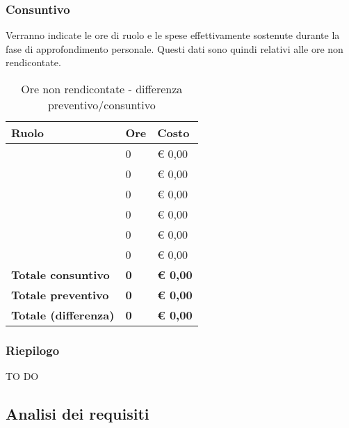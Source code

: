 		\subsubsection{Consuntivo} %
		\label{ssub:consuntivo}
		Verranno indicate le ore di ruolo e le spese effettivamente sostenute durante la fase di approfondimento personale. Questi dati sono quindi relativi alle ore non rendicontate.
		\begin{table}[!h]
			\begin{center}
				\begin{tabularx}{0.65\textwidth}{|l|l|X|}
					\hline
					\textbf{Ruolo} & \textbf{Ore} & \textbf{Costo} \\
					\hline
					\roleProjectManager & 0 & \euro{} 0,00 \\
					\hline
					\roleAnalyst & 0 & \euro{} 0,00 \\
					\hline
					\roleDesigner & 0 & \euro{} 0,00 \\
					\hline
					\roleAdministrator & 0 & \euro{} 0,00 \\
					\hline
					\roleProgrammer & 0 & \euro{} 0,00 \\
					\hline
					\roleVerifier & 0 & \euro{} 0,00 \\
					\hline
					\textbf{Totale consuntivo} & \textbf{0} & \textbf{\euro{} 0,00} \\
					\hline
					\textbf{Totale preventivo} & \textbf{0} & \textbf{\euro{} 0,00} \\
					\hline
					\textbf{Totale (differenza)} & \textbf{0} & \textbf{\euro{} 0,00} \\
					\hline
				\end{tabularx}
			\end{center}
		\caption{Ore non rendicontate - differenza preventivo/consuntivo}
		\end{table}
		
		\subsubsection{Riepilogo} %
		\label{ssub:riepilogo}
		TO DO
		

	\subsection{Analisi dei requisiti} %
	\label{sub:analisi_dei_requisiti}
